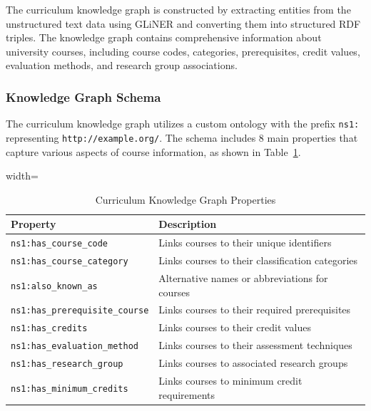 The curriculum knowledge graph is constructed by extracting entities from the unstructured text data using GLiNER \citep{zaratiana2023glinergeneralistmodelnamed} and converting them into structured RDF triples. The knowledge graph contains comprehensive information about university courses, including course codes, categories, prerequisites, credit values, evaluation methods, and research group associations.

\subsubsection{Knowledge Graph Schema}
The curriculum knowledge graph utilizes a custom ontology with the prefix \texttt{ns1:} representing \texttt{http://example.org/}. The schema includes 8 main properties that capture various aspects of course information, as shown in Table~\ref{table-curriculum-properties}.

\begin{table}[htbp]
\centering
\renewcommand{\arraystretch}{1.15}
\setlength{\tabcolsep}{12pt}
\begin{adjustbox}{width=\textwidth}
    \begin{tabular}{| m{} | m{} |}
    \hline
    \textbf{Property} & \textbf{Description} \\
    \hline
    \texttt{ns1:has\_course\_code} & Links courses to their unique identifiers \\
    \hline
    \texttt{ns1:has\_course\_category} & Links courses to their classification categories \\
    \hline
    \texttt{ns1:also\_known\_as} & Alternative names or abbreviations for courses \\
    \hline
    \texttt{ns1:has\_prerequisite\_course} & Links courses to their required prerequisites \\
    \hline
    \texttt{ns1:has\_credits} & Links courses to their credit values \\
    \hline
    \texttt{ns1:has\_evaluation\_method} & Links courses to their assessment techniques \\
    \hline
    \texttt{ns1:has\_research\_group} & Links courses to associated research groups \\
    \hline
    \texttt{ns1:has\_minimum\_credits} & Links courses to minimum credit requirements \\
    \hline
    \end{tabular}
\end{adjustbox}
\caption{Curriculum Knowledge Graph Properties}
\label{table-curriculum-properties}
\end{table}

